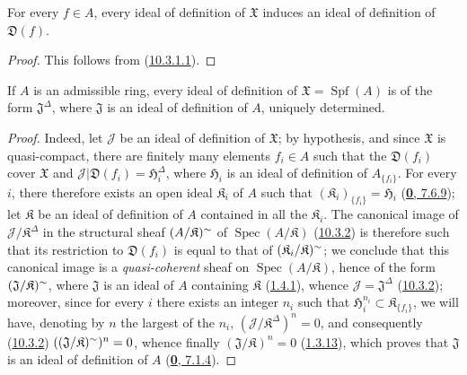 \begin{proposition}[10.3.4]
\label{I.10.3.4}
For every $f\in A$, every ideal of definition of $\mathfrak{X}$ induces an
ideal of definition of $\mathfrak{D}(f)$.
\end{proposition}

\begin{proof}
This follows from (\hyperref[I.10.3.1.1]{10.3.1.1}).
\end{proof}

\begin{proposition}[10.3.5]
\label{I.10.3.5}
If $A$ is an admissible ring, every ideal of definition of
$\mathfrak{X}=\operatorname{Spf}(A)$ is of the form
$\mathfrak{J}^\Delta$, where $\mathfrak{J}$ is an ideal of definition of
$A$, uniquely determined.
\end{proposition}

\begin{proof}
Indeed, let $\mathscr{J}$ be an ideal of definition of $\mathfrak{X}$;
by hypothesis, and since $\mathfrak{X}$ is quasi-compact, there are finitely
many elements $f_i\in A$ such that the $\mathfrak{D}(f_i)$ cover
$\mathfrak{X}$ and
$\mathscr{J}|\mathfrak{D}(f_i)=\mathfrak{H}_i^\Delta$, where
$\mathfrak{H}_i$ is an ideal of definition of $A_{\{f_i\}}$. For every
$i$, there therefore exists an open ideal $\mathfrak{K}_i$ of $A$ such that
$(\mathfrak{K}_i)_{\{f_i\}}=\mathfrak{H}_i$
(\hyperref[0.7.6.9]{\textbf{0}, 7.6.9}); let $\mathfrak{K}$ be an ideal of
definition of $A$ contained in all the $\mathfrak{K}_i$. The canonical image
of $\mathscr{J}/\mathfrak{K}^\Delta$ in the structural sheaf
$(A/\mathfrak{K})^{\sim}$ of
$\operatorname{Spec}(A/\mathfrak{K})$
(\hyperref[I.10.3.2]{10.3.2}) is therefore such that its restriction to
$\mathfrak{D}(f_i)$ is equal to that of
$(\mathfrak{K}_i/\mathfrak{K})^{\sim}$; we conclude that this canonical
image is a \emph{quasi-coherent} sheaf on
$\operatorname{Spec}(A/\mathfrak{K})$, hence of the form
$(\mathfrak{J}/\mathfrak{K})^{\sim}$, where $\mathfrak{J}$ is an ideal of
$A$ containing $\mathfrak{K}$ (\hyperref[I.1.4.1]{1.4.1}), whence
$\mathscr{J}=\mathfrak{J}^\Delta$
(\hyperref[I.10.3.2]{10.3.2}); moreover, since for every $i$ there
exists an integer $n_i$ such that
$\mathfrak{H}_i^{n_i}\subset\mathfrak{K}_{\{f_i\}}$, we will have, denoting
by $n$ the largest of the $n_i$,
$(\mathscr{J}/\mathfrak{K}^\Delta)^n=0$, and consequently
(\hyperref[I.10.3.2]{10.3.2})
$((\mathfrak{J}/\mathfrak{K})^{\sim})^n=0$, whence finally
$(\mathfrak{J}/\mathfrak{K})^n=0$
(\hyperref[I.1.3.13]{1.3.13}), which proves that $\mathfrak{J}$ is an
ideal of definition of $A$ (\hyperref[0.7.1.4]{\textbf{0}, 7.1.4}).
\end{proof}


